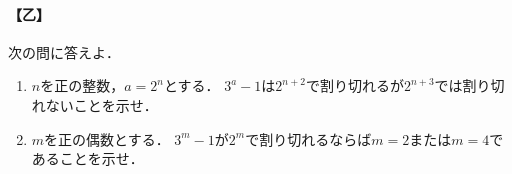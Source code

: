 \documentclass[../../main.tex]{subfiles}
\begin{document}
\paragraph{【乙】}
次の問に答えよ．
\begin{enumerate}
  \item $n$を正の整数，$a=2^n$とする．
    $3^a-1$は$2^{n+2}$で割り切れるが$2^{n+3}$では割り切れないことを示せ．
  \item $m$を正の偶数とする．
    $3^m-1$が$2^m$で割り切れるならば$m=2$または$m=4$であることを示せ．
\end{enumerate}
\end{document}
